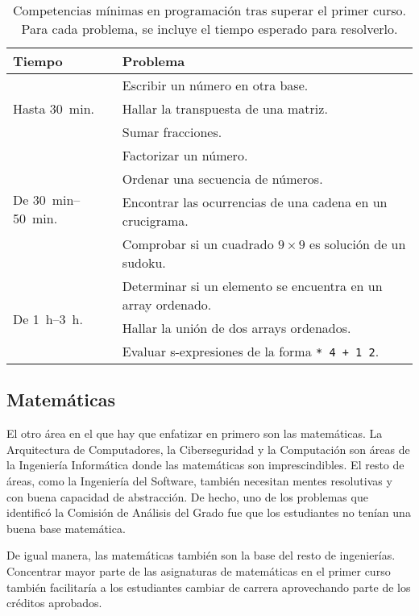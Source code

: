 \begin{table}[h]
    \centering
    \begin{tabular}{ll}
        \textbf{Tiempo} & \textbf{Problema} \\
        \hline
        \multirow{3}{*}{Hasta \SI{30}{min}.}
        & Escribir un número en otra base. \\
        & Hallar la transpuesta de una matriz. \\
        & Sumar fracciones. \\
        \hline
        \multirow{4}{*}{De \SIrange{30}{50}{min}.}
        & Factorizar un número. \\ 
        & Ordenar una secuencia de números. \\
        & Encontrar las ocurrencias de una cadena en un crucigrama. \\
        & Comprobar si un cuadrado $9\times 9$ es solución de un sudoku. \\
        \hline
        \multirow{3}{*}{De \SIrange{1}{3}{h}.}
        & Determinar si un elemento se encuentra en un array ordenado. \\
        & Hallar la unión de dos arrays ordenados. \\
        & Evaluar s-expresiones de la forma \lstinline!* 4 + 1 2!.
    \end{tabular}
    \caption{
        Competencias mínimas en programación tras superar el primer curso.
        Para cada problema, se incluye el tiempo esperado para resolverlo.
    }
    \label{tab:first-course-programming-examples}
\end{table}

\subsection{Matemáticas}

El otro área en el que hay que enfatizar en primero son las matemáticas.
La Arquitectura de Computadores, la Ciberseguridad y la Computación
son áreas de la Ingeniería Informática donde
las matemáticas son imprescindibles.
El resto de áreas, como la Ingeniería del Software,
también necesitan mentes resolutivas y con buena capacidad de abstracción.
De hecho, uno de los problemas que
identificó la Comisión de Análisis del Grado
fue que los estudiantes no tenían una buena base matemática.

De igual manera,
las matemáticas también son la base del resto de ingenierías.
Concentrar mayor parte de las asignaturas de matemáticas en el primer curso
también facilitaría a los estudiantes cambiar de carrera
aprovechando parte de los créditos aprobados.


